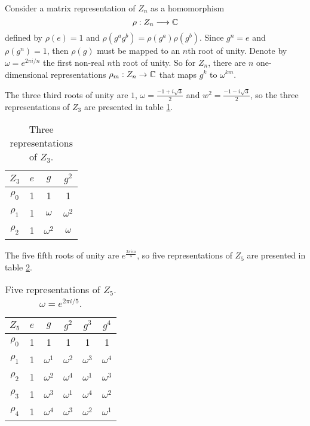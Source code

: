 		Consider a matrix representation of $Z_n$ as a homomorphism
		\[
		\rho: Z_n \longrightarrow \mathbb{C}
		\]
		defined by $\rho(e) = 1$ and $\rho(g^a g^b) = \rho(g^a)\rho(g^b)$. Since $g^n = e$ and $\rho(g^n) = 1$, then $\rho(g)$ must be mapped to an $n$th root of unity. Denote by $\omega = e^{2\pi i/n}$ the first non-real $n$th root of unity. So for $Z_n$, there are $n$ one-dimensional representations $\rho_m: Z_n \rightarrow \mathbb{C}$ that maps $g^k$ to $\omega^{km}$.
		
		\begin{example}[$Z_3$]
			The three third roots of unity are $1$, $\omega = \frac{-1+i\sqrt{3}}{2}$ and $w^2 = \frac{-1-i\sqrt{3}}{2}$, so the three representations of $Z_3$ are presented in table \ref{table:Z3}.
			
			\begin{table}[hbt!]
				\centering
				\caption{Three representations of $Z_3$.}
				\begin{tabular}{c | c c c}
					\label{table:Z3}
					$Z_3$ & $e$ & $g$        & $g^2$      \\ \hline
					$\rho_0$          & 1   & 1          & 1          \\
					$\rho_1$          & 1   & $\omega$   & $\omega^2$ \\
					$\rho_2$          & 1   & $\omega^2$ & $\omega$
				\end{tabular}
			\end{table}
		\end{example}
		
		\begin{example}[$Z_5$]
			The five fifth roots of unity are $e^{\frac{2\pi im}{5}}$, so five representations of $Z_5$ are presented in table \ref{table:Z5}.
			
			\begin{table}[hbt!]
				\centering
				\caption{Five representations of $Z_5$. $\omega = e^{2 \pi i/5}$.}
				\begin{tabular}{c | c c c c c}
					\label{table:Z5}
					$Z_5$ & $e$ & $g$        & $g^2$      & $g^3$      & $g^4$      \\ \hline
					$\rho_0$            & 1   & 1          & 1          & 1          & 1          \\
					$\rho_1$            & 1   & $\omega^1$ & $\omega^2$ & $\omega^3$ & $\omega^4$ \\
					$\rho_2$            & 1   & $\omega^2$ & $\omega^4$ & $\omega^1$ & $\omega^3$ \\
					$\rho_3$            & 1   & $\omega^3$ & $\omega^1$ & $\omega^4$ & $\omega^2$ \\
					$\rho_4$            & 1   & $\omega^4$ & $\omega^3$ & $\omega^2$ & $\omega^1$
				\end{tabular}
			\end{table}
		\end{example}
		
			
			